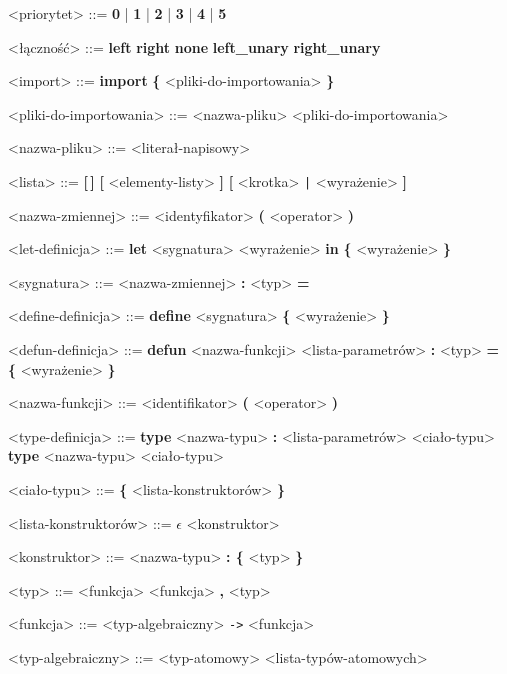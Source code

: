 \documentclass[12pt]{article}
\begin{document}
\begin{grammar}
<priorytet> ::=
    \textbf{0} | \textbf{1} | \textbf{2} | \textbf{3} | \textbf{4} | \textbf{5}

<łączność> ::=
    \textbf{left}
    \alt \textbf{right}
    \alt \textbf{none}
    \alt \textbf{left_unary}
    \alt \textbf{right_unary}

<import> ::=
    \textbf{import} \textbf{\{} <pliki-do-importowania> \textbf{\}}

<pliki-do-importowania> ::=
    <nazwa-pliku>
     <pliki-do-importowania>

<nazwa-pliku> ::=
    <literał-napisowy>


<lista> ::=
    \textbf{[\,]}
    \alt \textbf{[} <elementy-listy> \textbf{]}
    \alt \textbf{[} <krotka> \texttt{|} <wyrażenie> \textbf{]}

<nazwa-zmiennej> ::=
    <identyfikator>
    \alt \textbf{(} <operator> \textbf{)}

<let-definicja> ::=
    \textbf{let} <sygnatura> <wyrażenie>
    \textbf{in} \textbf{\{} <wyrażenie> \textbf{\}} 

<sygnatura> ::=
    <nazwa-zmiennej> \textbf{:} <typ> \textbf{=}

<define-definicja> ::=
    \textbf{define} <sygnatura> \textbf{\{} <wyrażenie> \textbf{\}}

<defun-definicja> ::=
    \textbf{defun} <nazwa-funkcji> <lista-parametrów> \textbf{:} <typ> 
    \textbf{= \{} <wyrażenie> \textbf{\}}

<nazwa-funkcji> ::=
    <identifikator>
    \alt \textbf{(} <operator> \textbf{)}

<type-definicja> ::=
    \textbf{type} <nazwa-typu> 
    \textbf{:} <lista-parametrów> <ciało-typu>
    \alt \textbf{type} <nazwa-typu> <ciało-typu>

<ciało-typu> ::= 
    \textbf{\{} <lista-konstruktorów> \textbf{\}}

<lista-konstruktorów> ::=
    $\epsilon$
     <konstruktor>

<konstruktor> ::=
    <nazwa-typu>
     \textbf{: \{} <typ> \textbf{\}}
    
<typ> ::=
    <funkcja>
    \alt <funkcja> \textbf{,} <typ>

<funkcja> ::= 
    <typ-algebraiczny>
     \texttt{->} <funkcja>

<typ-algebraiczny> ::=
    <typ-atomowy>
     <lista-typów-atomowych>


\end{grammar}
\end{document}
